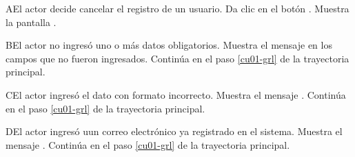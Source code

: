 \begin{UCtrayectoriaA}{A}{El actor decide cancelar el registro de un usuario.}
	\UCpaso [\UCactor] Da clic en el botón .
	\UCpaso [\UCsist] Muestra la pantalla .
\end{UCtrayectoriaA} 

\begin{UCtrayectoriaA}{B}{El actor no ingresó uno o más datos obligatorios.}
	\UCpaso [\UCsist] Muestra el mensaje  en los campos que no
	fueron ingresados.
	\UCpaso [\UCsist] Continúa en el paso \ref{cu01-grl} de la trayectoria principal.
\end{UCtrayectoriaA} 

\begin{UCtrayectoriaA}{C}{El actor ingresó el dato con formato incorrecto.}
	\UCpaso [\UCsist] Muestra el mensaje .
	\UCpaso [\UCsist] Continúa en el paso \ref{cu01-grl} de la trayectoria principal.
\end{UCtrayectoriaA} 

\begin{UCtrayectoriaA}{D}{El actor ingresó uun correo electrónico ya registrado en el sistema.}
	\UCpaso [\UCsist] Muestra el mensaje .
	\UCpaso [\UCsist] Continúa en el paso \ref{cu01-grl} de la trayectoria principal.
\end{UCtrayectoriaA} 
